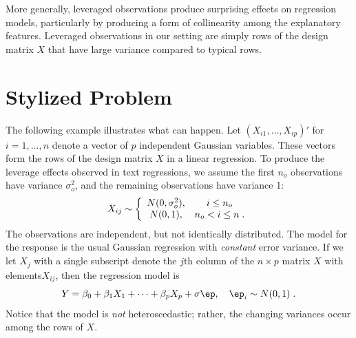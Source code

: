 \documentclass[12pt]{article}
\begin{document}
 More generally, leveraged observations produce surprising effects on regression
 models, particularly by producing a form of collinearity among the explanatory
 features.  Leveraged observations in our setting are simply rows of the design
 matrix $X$ that have large variance compared to typical rows.


\section{ Stylized Problem }
\label{sec:problem}

 The following example illustrates what can happen.  Let $(X_{i1}, \ldots,
 X_{ip})'$ for $i = 1,\ldots,n$ denote a vector of $p$ independent Gaussian
 variables.  These vectors form the rows of the design matrix $X$ in a linear
 regression.  To produce the leverage effects observed in text regressions, we
 assume the first $n_o$ observations have variance $\sigma_o^2$, and the
 remaining observations have variance 1:
 \begin{equation}
    X_{ij} \sim \left\{ \begin{array}{cc}
              N(0,\sigma_o^2), & i \le n_o \cr
              N(0,1)    , & n_o < i \le n \;.
   \end{array} \right.
 \label{eq:Xij}
 \end{equation}
 The observations are independent, but not identically distributed.  The model
 for the response is the usual Gaussian regression with {\em constant} error
 variance.  If we let $X_j$ with a single subscript denote the $j$th column of
the $n \times p$ matrix $X$ with elements$X_{ij}$, then the regression model is
 \begin{equation}
   Y = \beta_0 + \beta_1 X_{1} + \cdots + \beta_p X_{p} + \sigma \ep,
        \quad \ep_i \sim N(0,1) \;.   
 \label{eq:Yi}
 \end{equation}
 Notice that the model is {\em not} heteroscedastic; rather, the changing
 variances occur among the rows of $X$.
\end{document}
